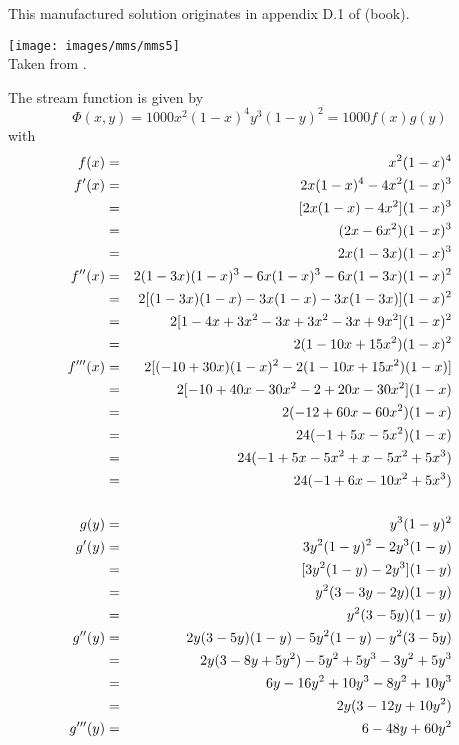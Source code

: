 
This manufactured solution originates in appendix D.1 of \textcite{john16} (book).

\begin{center}
\texttt{[image: images/mms/mms5]}\\
{\captionfont Taken from \cite{john16}.}
\end{center}

The stream function is given by
\[
\Phi(x,y) = 1000x^2(1-x)^4 y^3 (1-y)^2 = 1000 f(x)g(y)
\]
with 
\begin{eqnarray}
f(x)&=& x^2(1-x)^4 \nonumber\\
f'(x) 
&=& 2x (1-x)^4 - 4x^2 (1-x)^3 \nonumber\\
&=& [2x(1-x) -4x^2] (1-x)^3 \nonumber\\
&=& (2x-6x^2) (1-x)^3 \nonumber\\
&=& 2x(1-3x) (1-x)^3 \nonumber\\
f''(x) 
&=& 2(1-3x)(1-x)^3 -6x (1-x)^3 -6x(1-3x)(1-x)^2 \nonumber\\
&=& 2[ (1-3x)(1-x) -3x(1-x) -3x(1-3x)  ] (1-x)^2 \nonumber\\
&=& 2[ 1-4x+3x^2 -3x+3x^2 -3x+9x^2 ] (1-x)^2 \nonumber\\
&=& 2(1-10x+15x^2)(1-x)^2 \nonumber\\
f'''(x)
&=& 2[(-10+30x)(1-x)^2 -2 (1-10x+15x^2)(1-x)] \nonumber\\
&=& 2[-10+40x-30x^2  -2+20x-30x^2 ](1-x) \nonumber\\
&=& 2(-12+60x-60x^2 )(1-x) \nonumber\\
&=& 24 (-1+5x-5x^2 )(1-x) \nonumber\\
&=& 24(-1+5x-5x^2+x-5x^2+5x^3) \nonumber\\
&=& 24(-1+6x-10x^2+5x^3 ) \nonumber\\
\nonumber\\
g(y) &=& y^3(1-y)^2 \nonumber\\
g'(y) 
&=& 3y^2(1-y)^2 -2y^3 (1-y) \nonumber\\
&=& [3y^2(1-y) -2y^3] (1-y) \nonumber\\
&=& y^2 (3-3y-2y) (1-y) \nonumber\\
&=& y^2 (3-5y) (1-y) \nonumber\\
g''(y) 
&=& 2y (3-5y) (1-y) -5y^2  (1-y) -y^2 (3-5y)  \nonumber\\
&=& 2y(3-8y+5y^2) -5y^2 + 5y^3 - 3y^2 + 5y^3 \nonumber\\
&=& 6y -16y^2 + 10y^3 -8y^2 +10y^3 \nonumber\\
&=& 2y(3 -12y+10y^2) \nonumber\\
g'''(y) 
&=& 6 - 48y +60y^2 \nonumber
\end{eqnarray}

